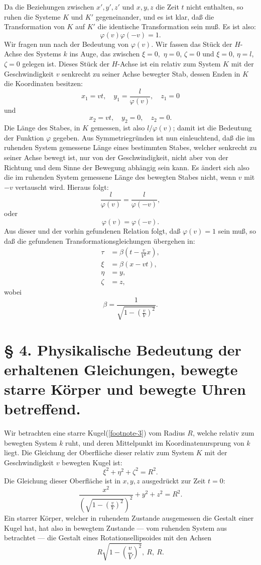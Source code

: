 \documentclass[17pt]{webarticle}       %
\begin{document}
Da die Beziehungen zwischen \( x', y', z' \) und \( x, y, z \) die Zeit \( t \) nicht enthalten, so ruhen die Systeme \( K \) und \( K' \) gegeneinander, und es ist klar, daß die Transformation von \( K \) auf \( K' \) die identische Transformation sein muß. Es ist also:
\[
\varphi(v) \varphi(-v) = 1.
\]
Wir fragen nun nach der Bedeutung von \(\varphi(v)\). Wir fassen das Stück der \( H \)-Achse des Systems \( k \) ins Auge, das zwischen \(\xi = 0, \) \( \eta = 0 \), \( \zeta = 0 \) und \( \xi = 0 \), \( \eta = l \), \( \zeta = 0\) gelegen ist. Dieses Stück der \( H \)-Achse ist ein relativ zum System \( K \) mit der Geschwindigkeit \( v \) senkrecht zu seiner Achse bewegter Stab, dessen Enden in \( K \) die Koordinaten besitzen:
\[
x_1 = vt, \quad y_1 = \frac{l}{\varphi(v)}, \quad z_1 = 0
\]
und
\[
x_2 = vt, \quad y_2 = 0, \quad z_2 = 0.
\]
Die Länge des Stabes, in \( K \) gemessen, ist also \( l / \varphi(v) \); damit ist die Bedeutung der Funktion \( \varphi \) gegeben. Aus Symmetriegründen ist nun einleuchtend, daß die im ruhenden System gemessene Länge eines bestimmten Stabes, welcher senkrecht zu seiner Achse bewegt ist, nur von der Geschwindigkeit, nicht aber von der Richtung und dem Sinne der Bewegung abhängig sein kann. Es ändert sich also die im ruhenden System gemessene Länge des bewegten Stabes nicht, wenn \( v \) mit \( -v \) vertauscht wird. Hieraus folgt:
\[
\frac{l}{\varphi(v)} = \frac{l}{\varphi(-v)},
\]
oder
\[
\varphi(v) = \varphi(-v).
\]
Aus dieser und der vorhin gefundenen Relation folgt, daß \( \varphi(v) = 1 \) sein muß, so daß die gefundenen Transformationsgleichungen übergehen in:
\[
\begin{aligned}
\tau &= \beta \left( t - \frac{v}{V^2} x \right),
\\
\xi &= \beta (x - vt),
\\
\eta &= y,
\\
\zeta &= z,
\end{aligned}
\]
wobei
\[
\beta = \frac{1}{\sqrt{1 - \left( \frac{v}{V} \right)^2}}.
\]

\section*{§ 4. Physikalische Bedeutung der erhaltenen Gleichungen, bewegte starre Körper und bewegte Uhren betreffend.}

Wir betrachten eine starre Kugel(\ref{footnote-3}) vom Radius \( R \), welche relativ zum bewegten System \( k \) ruht, und deren Mittelpunkt im Koordinatenursprung von \( k \) liegt. Die Gleichung der Oberfläche dieser relativ zum System \( K \) mit der Geschwindigkeit \( v \) bewegten Kugel ist:
\[
\xi^2 + \eta^2 + \zeta^2 = R^2.
\]
Die Gleichung dieser Oberfläche ist in \( x, y, z \) ausgedrückt zur Zeit \( t = 0 \):
\[
\frac{x^2}{\left( \sqrt{1 - \left( \frac{v}{V} \right)^2} \right)^2} + y^2 + z^2 = R^2.
\]
Ein starrer Körper, welcher in ruhendem Zustande ausgemessen die Gestalt einer Kugel hat, hat also in bewegtem Zustande — vom ruhenden System aus betrachtet — die Gestalt eines Rotationsellipsoides mit den Achsen
\[
R \sqrt{1 - \left( \frac{v}{V} \right)^2}, \ R, \ R.
\]
\end{document}
